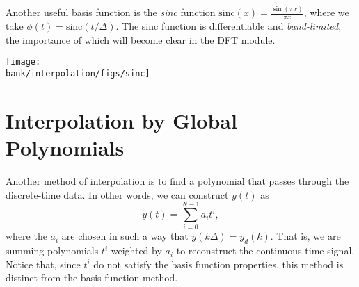 Another useful basis function is the \emph{sinc} function $\text{sinc}(x)= \frac{\sin(\pi x)}{\pi x}$, where we take $\phi(t)=\text{sinc}(t/\Delta)$.
The sinc function is differentiable and \emph{band-limited}, the importance of which will become clear in the DFT module.

\begin{center}
\texttt{[image: \\bank/interpolation/figs/sinc]}
\end{center}


\section{Interpolation by Global Polynomials}

Another method of interpolation is to find a polynomial that passes through the discrete-time data.
In other words, we can construct $y(t)$ as
\begin{equation*}
 y(t) = \sum_{i=0}^{N-1} a_i t^i,
\end{equation*}
where the $a_i$ are chosen in such a way that $y(k\Delta)=y_d(k)$.
That is, we are summing polynomials $t^i$ weighted by $a_i$ to reconstruct the continuous-time signal.
Notice that, since $t^i$ do not satisfy the basis function properties, this method is distinct from the basis function method.

